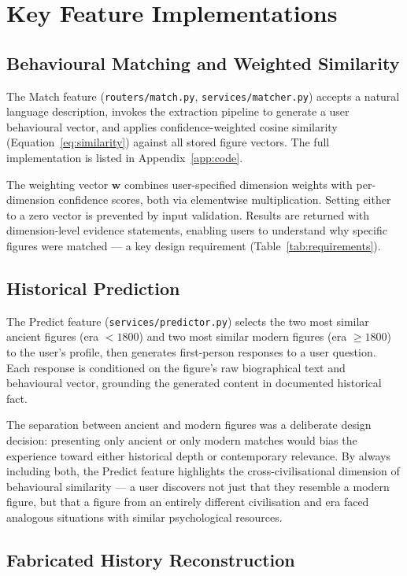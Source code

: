 \documentclass[11pt, a4paper]{report}
\begin{document}
\section{Key Feature Implementations}

\subsection{Behavioural Matching and Weighted Similarity}

The Match feature (\texttt{routers/match.py}, \texttt{services/matcher.py}) accepts a natural language description, invokes the extraction pipeline to generate a user behavioural vector, and applies confidence-weighted cosine similarity (Equation~\ref{eq:similarity}) against all stored figure vectors. The full implementation is listed in Appendix~\ref{app:code}.

The weighting vector $\mathbf{w}$ combines user-specified dimension weights with per-dimension confidence scores, both via elementwise multiplication. Setting either to a zero vector is prevented by input validation. Results are returned with dimension-level evidence statements, enabling users to understand why specific figures were matched — a key design requirement (Table~\ref{tab:requirements}).

\subsection{Historical Prediction}

The Predict feature (\texttt{services/predictor.py}) selects the two most similar ancient figures (era $< 1800$) and two most similar modern figures (era $\geq 1800$) to the user's profile, then generates first-person responses to a user question. Each response is conditioned on the figure's raw biographical text and behavioural vector, grounding the generated content in documented historical fact.

The separation between ancient and modern figures was a deliberate design decision: presenting only ancient or only modern matches would bias the experience toward either historical depth or contemporary relevance. By always including both, the Predict feature highlights the cross-civilisational dimension of behavioural similarity — a user discovers not just that they resemble a modern figure, but that a figure from an entirely different civilisation and era faced analogous situations with similar psychological resources.

\subsection{Fabricated History Reconstruction}
\end{document}
